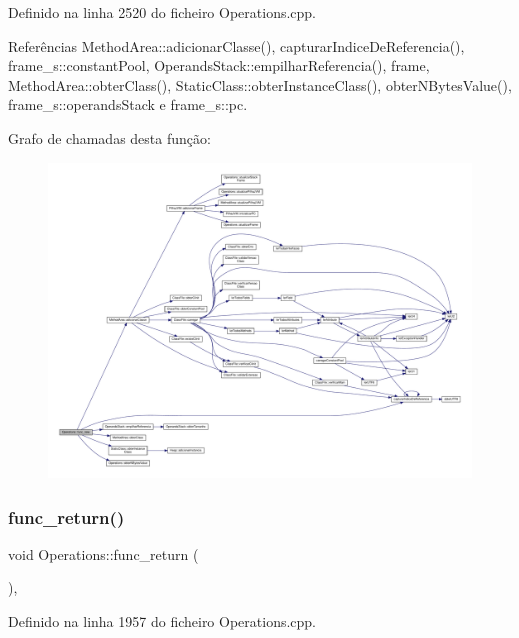 Definido na linha 2520 do ficheiro Operations.\+cpp.



Referências Method\+Area\+::adicionar\+Classe(), capturar\+Indice\+De\+Referencia(), frame\+\_\+s\+::constant\+Pool, Operands\+Stack\+::empilhar\+Referencia(), frame, Method\+Area\+::obter\+Class(), Static\+Class\+::obter\+Instance\+Class(), obter\+N\+Bytes\+Value(), frame\+\_\+s\+::operands\+Stack e frame\+\_\+s\+::pc.

Grafo de chamadas desta função\+:
\nopagebreak
\begin{figure}[H]
\begin{center}
\leavevmode
\includegraphics[width=350pt]{classOperations_a7594e147407e1f4ede57229899fd17d6_cgraph}
\end{center}
\end{figure}
\mbox{\label{classOperations_aa33b77fb62f7e76c347503c97c6b080b}} 
\subsubsection{\texorpdfstring{func\+\_\+return()}{func\_return()}}
{\footnotesize\ttfamily void Operations\+::func\+\_\+return (\begin{DoxyParamCaption}{ }\end{DoxyParamCaption})\hspace{0.3cm}{\ttfamily [static]}, {\ttfamily [private]}}



Definido na linha 1957 do ficheiro Operations.\+cpp.



